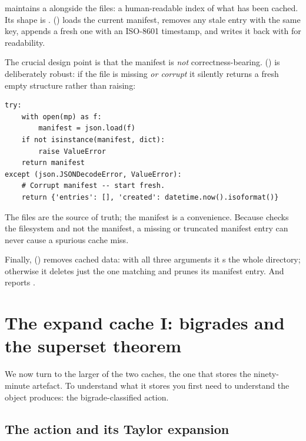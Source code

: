  maintains a  alongside the
 files: a human-readable index of what has been cached. Its shape
is .  () loads
the current manifest, removes any stale entry with the same key, appends a
fresh one with an ISO-8601 timestamp, and writes it back with
 for readability.

The crucial design point is that the manifest is \emph{not} correctness-bearing.
 () is deliberately robust: if the
file is missing \emph{or corrupt} it silently returns a fresh empty structure
rather than raising:

\begin{lstlisting}
try:
    with open(mp) as f:
        manifest = json.load(f)
    if not isinstance(manifest, dict):
        raise ValueError
    return manifest
except (json.JSONDecodeError, ValueError):
    # Corrupt manifest -- start fresh.
    return {'entries': [], 'created': datetime.now().isoformat()}
\end{lstlisting}

The  files are the source of truth; the manifest is a convenience.
Because  checks the filesystem and not the manifest, a missing or
truncated manifest entry can never cause a spurious cache miss.

Finally,  () removes cached data: with all three
arguments  it s the whole directory; otherwise
it deletes just the one matching  and prunes its manifest entry.
And  reports .

\section{The expand cache I: bigrades and the superset theorem}

We now turn to the larger of the two caches, the one that stores the
ninety-minute artefact. To understand what it stores you first need to
understand the object  produces: the
bigrade-classified action.

\subsection{The \msrjd{} action and its Taylor expansion}

